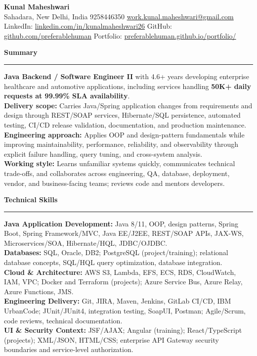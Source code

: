 \documentclass[11pt,letterpaper]{article}
\newcommand{\ressection}[1]{\Needspace{6\baselineskip}\vspace{8pt}\par\textbf{#1}\par\vspace{2pt}\hrule\vspace{5pt}}
\begin{document}
\pagestyle{empty}\raggedright\fontsize{11}{12.5}\selectfont

{\Large \textbf{Kunal Maheshwari}}\\
Sahadara, New Delhi, India \textbar{} 9258446350 \textbar{} \href{mailto:work.kunal.maheshwari@gmail.com}{work.kunal.maheshwari@gmail.com}\\
LinkedIn: \href{https://www.linkedin.com/in/kunalmaheshwari26}{linkedin.com/in/kunalmaheshwari26} \textbar{} GitHub: \href{https://github.com/preferablehuman}{github.com/preferablehuman} \textbar{} Portfolio: \href{https://preferablehuman.github.io/portfolio/}{preferablehuman.github.io/portfolio/}

\ressection{Summary}
\textbf{Java Backend / Software Engineer II} with 4.6+ years developing enterprise healthcare and automotive applications, including services handling \textbf{50K+ daily requests at 99.99\% SLA availability}.\\[2pt]
\textbf{Delivery scope:} Carries Java/Spring application changes from requirements and design through REST/SOAP services, Hibernate/SQL persistence, automated testing, CI/CD release validation, documentation, and production maintenance.\\[2pt]
\textbf{Engineering approach:} Applies OOP and design-pattern fundamentals while improving maintainability, performance, reliability, and observability through explicit failure handling, query tuning, and cross-system analysis.\\[2pt]
\textbf{Working style:} Learns unfamiliar systems quickly, communicates technical trade-offs, and collaborates across engineering, QA, database, deployment, vendor, and business-facing teams; reviews code and mentors developers.

\ressection{Technical Skills}
\textbf{Java Application Development:} Java 8/11, OOP, design patterns, Spring Boot, Spring Framework/MVC, Java EE/J2EE, REST/SOAP APIs, JAX-WS, Microservices/SOA, Hibernate/HQL, JDBC/OJDBC.\\
\textbf{Databases:} SQL, Oracle, DB2; PostgreSQL (project/training); relational database concepts, SQL/HQL query optimization, database integration.\\
\textbf{Cloud \& Architecture:} AWS S3, Lambda, EFS, ECS, RDS, CloudWatch, IAM, VPC; Docker and Terraform (projects); Azure Service Bus, Azure Relay, Azure Functions, JMS.\\
\textbf{Engineering Delivery:} Git, JIRA, Maven, Jenkins, GitLab CI/CD, IBM UrbanCode; JUnit/JUnit4, integration testing, SoapUI, Postman; Agile/Scrum, code reviews, technical documentation.\\
\textbf{UI \& Security Context:} JSF/AJAX; Angular (training); React/TypeScript (projects); XML/JSON, HTML/CSS; enterprise API Gateway security boundaries and service-level authorization.
\end{document}

